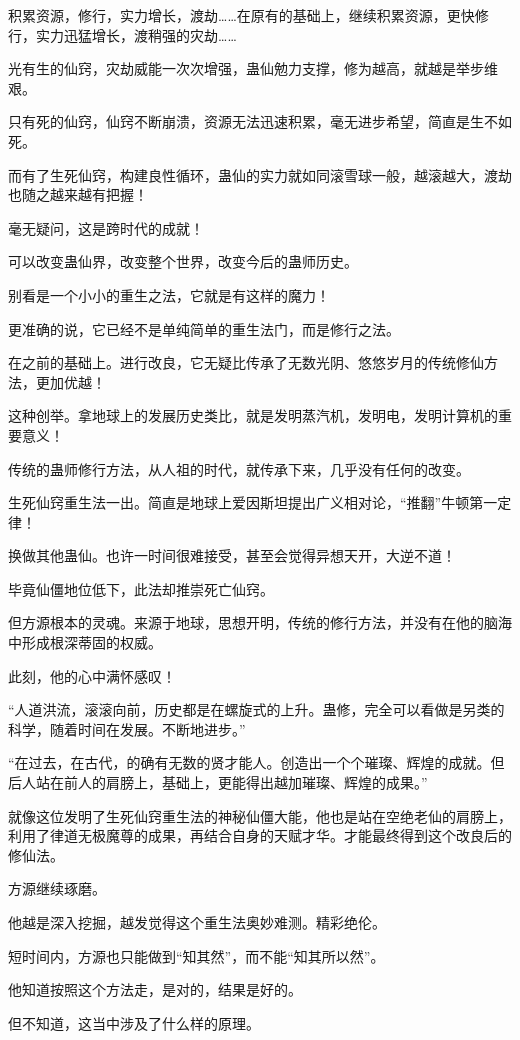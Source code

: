 \begin{this_body}
积累资源，修行，实力增长，渡劫……在原有的基础上，继续积累资源，更快修行，实力迅猛增长，渡稍强的灾劫……

光有生的仙窍，灾劫威能一次次增强，蛊仙勉力支撑，修为越高，就越是举步维艰。

只有死的仙窍，仙窍不断崩溃，资源无法迅速积累，毫无进步希望，简直是生不如死。

而有了生死仙窍，构建良性循环，蛊仙的实力就如同滚雪球一般，越滚越大，渡劫也随之越来越有把握！

毫无疑问，这是跨时代的成就！

可以改变蛊仙界，改变整个世界，改变今后的蛊师历史。

别看是一个小小的重生之法，它就是有这样的魔力！

更准确的说，它已经不是单纯简单的重生法门，而是修行之法。

在之前的基础上。进行改良，它无疑比传承了无数光阴、悠悠岁月的传统修仙方法，更加优越！

这种创举。拿地球上的发展历史类比，就是发明蒸汽机，发明电，发明计算机的重要意义！

传统的蛊师修行方法，从人祖的时代，就传承下来，几乎没有任何的改变。

生死仙窍重生法一出。简直是地球上爱因斯坦提出广义相对论，“推翻”牛顿第一定律！

换做其他蛊仙。也许一时间很难接受，甚至会觉得异想天开，大逆不道！

毕竟仙僵地位低下，此法却推崇死亡仙窍。

但方源根本的灵魂。来源于地球，思想开明，传统的修行方法，并没有在他的脑海中形成根深蒂固的权威。

此刻，他的心中满怀感叹！

“人道洪流，滚滚向前，历史都是在螺旋式的上升。蛊修，完全可以看做是另类的科学，随着时间在发展。不断地进步。”

“在过去，在古代，的确有无数的贤才能人。创造出一个个璀璨、辉煌的成就。但后人站在前人的肩膀上，基础上，更能得出越加璀璨、辉煌的成果。”

就像这位发明了生死仙窍重生法的神秘仙僵大能，他也是站在空绝老仙的肩膀上，利用了律道无极魔尊的成果，再结合自身的天赋才华。才能最终得到这个改良后的修仙法。

方源继续琢磨。

他越是深入挖掘，越发觉得这个重生法奥妙难测。精彩绝伦。

短时间内，方源也只能做到“知其然”，而不能“知其所以然”。

他知道按照这个方法走，是对的，结果是好的。

但不知道，这当中涉及了什么样的原理。


\end{this_body}
